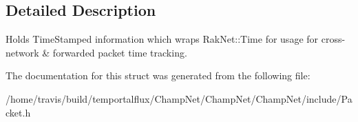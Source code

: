 \subsection{Detailed Description}
Holds Time\-Stamped information which wraps Rak\-Net\-::\-Time for usage for cross-\/network \& forwarded packet time tracking. 

The documentation for this struct was generated from the following file\-:\begin{DoxyCompactItemize}
\item 
/home/travis/build/temportalflux/\-Champ\-Net/\-Champ\-Net/\-Champ\-Net/include/Packet.\-h\end{DoxyCompactItemize}
